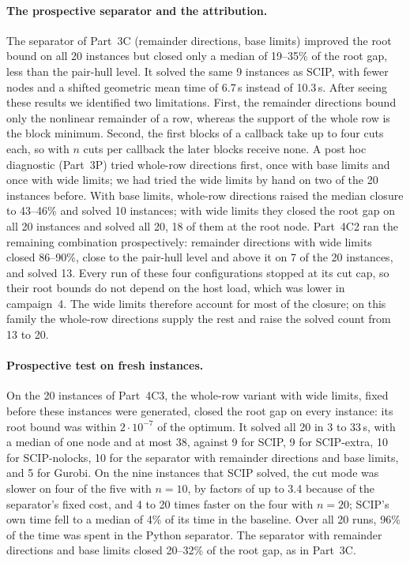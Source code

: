 \paragraph{The prospective separator and the attribution.} The separator of
Part~3C (remainder directions, base limits) improved the root bound on all 20
instances but closed only a median of 19--35\% of the root gap, less than the
pair-hull level. It solved the same 9 instances as SCIP, with fewer nodes and a
shifted geometric mean time of 6.7\,s instead of 10.3\,s. After seeing these
results we identified two limitations. First, the remainder directions bound
only the nonlinear remainder of a row, whereas the support of the whole row is
the block minimum. Second, the first blocks of a callback take up to four cuts
each, so with $n$ cuts per callback the later blocks receive none. A post hoc
diagnostic (Part~3P) tried whole-row directions first, once with base limits
and once with wide limits; we had tried the wide limits by hand on two of the
20 instances before. With base limits, whole-row directions raised the median
closure to 43--46\% and solved 10 instances; with wide limits they closed the
root gap on all 20 instances and solved all 20, 18 of them at the root node.
Part~4C2 ran the remaining combination prospectively: remainder directions
with wide limits closed 86--90\%, close to the pair-hull level and above it on
7 of the 20 instances, and solved 13. Every run of these four configurations
stopped at its cut cap, so their root bounds do not depend on the host load,
which was lower in campaign~4. The wide limits therefore account for most of
the closure; on this family the whole-row directions supply the rest and raise
the solved count from 13 to 20.

\paragraph{Prospective test on fresh instances.} On the 20 instances of
Part~4C3, the whole-row variant with wide limits, fixed before these instances
were generated, closed the root gap on every instance: its root bound was
within $2\cdot10^{-7}$ of the optimum. It solved all 20 in 3 to 33\,s, with a
median of one node and at most 38, against 9 for SCIP, 9 for SCIP-extra,
10 for SCIP-nolocks, 10 for the separator with remainder directions and base
limits, and 5 for Gurobi. On the nine instances that SCIP solved, the
cut mode was slower on four of the five with $n=10$, by factors of up to 3.4
because of the separator's fixed cost, and 4 to 20 times faster on the four
with $n=20$; SCIP's own time fell to a median of 4\% of its time in the
baseline. Over all 20 runs, 96\% of the time was spent in the Python separator.
The separator with remainder directions and base limits closed 20--32\% of the
root gap, as in Part~3C.


